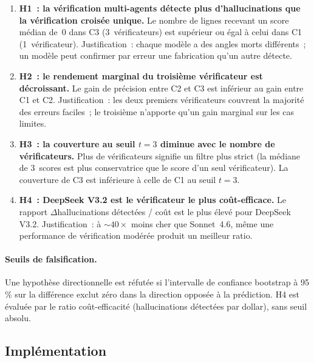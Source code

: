 \begin{enumerate}
\item \textbf{H1~: la v\'erification multi-agents d\'etecte plus d'hallucinations
  que la v\'erification crois\'ee unique.}
  Le nombre de lignes recevant un score m\'edian de~0 dans C3 (3~v\'erificateurs)
  est sup\'erieur ou \'egal \`a celui dans C1 (1~v\'erificateur). Justification~:
  chaque mod\`ele a des angles morts diff\'erents~; un mod\`ele peut confirmer par
  erreur une fabrication qu'un autre d\'etecte.

\item \textbf{H2~: le rendement marginal du troisi\`eme v\'erificateur est
  d\'ecroissant.}
  Le gain de pr\'ecision entre C2 et C3 est inf\'erieur au gain entre C1 et C2.
  Justification~: les deux premiers v\'erificateurs couvrent la majorit\'e des
  erreurs faciles~; le troisi\`eme n'apporte qu'un gain marginal sur les cas
  limites.

\item \textbf{H3~: la couverture au seuil $t=3$ diminue avec le nombre de
  v\'erificateurs.}
  Plus de v\'erificateurs signifie un filtre plus strict (la m\'ediane de
  3~scores est plus conservatrice que le score d'un seul v\'erificateur).
  La couverture de C3 est inf\'erieure \`a celle de C1 au seuil $t=3$.

\item \textbf{H4~: DeepSeek V3.2 est le v\'erificateur le plus co\^ut-efficace.}
  Le rapport $\Delta$hallucinations d\'etect\'ees / co\^ut est le plus \'elev\'e pour
  DeepSeek V3.2. Justification~: \`a ${\sim}40\times$ moins cher que Sonnet~4.6,
  m\^eme une performance de v\'erification mod\'er\'ee produit un meilleur ratio.
\end{enumerate}

\paragraph{Seuils de falsification.} Une hypoth\`ese directionnelle est
r\'efut\'ee si l'intervalle de confiance bootstrap \`a 95\,\% sur la diff\'erence
exclut z\'ero dans la direction oppos\'ee \`a la pr\'ediction. H4 est \'evalu\'ee
par le ratio co\^ut-efficacit\'e (hallucinations d\'etect\'ees par dollar), sans
seuil absolu.

\subsection{Impl\'ementation}\label{sec:multi-verif-implementation}

